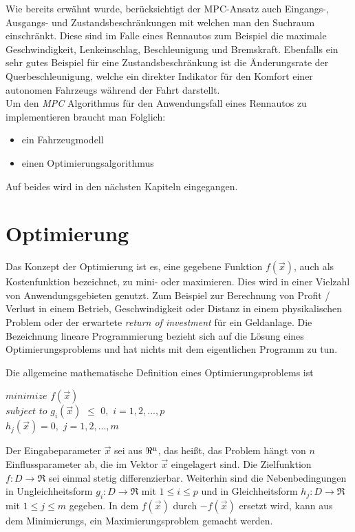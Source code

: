 \documentclass{like}
\begin{document}
Wie bereits erwähnt wurde, berücksichtigt der \ac{MPC}-Ansatz auch Eingangs-, Ausgangs- und Zustandsbeschränkungen mit welchen man den Suchraum einschränkt. Diese sind im Falle eines Rennautos zum Beispiel die maximale Geschwindigkeit, Lenkeinschlag, Beschleunigung und Bremskraft. Ebenfalls ein sehr gutes Beispiel für eine Zustandsbeschränkung ist die Änderungsrate der Querbeschleunigung, welche ein direkter Indikator für den Komfort einer autonomen Fahrzeugs während der Fahrt darstellt.\\

Um den \textit{\acl{MPC}} Algorithmus für den Anwendungsfall eines Rennautos zu implementieren braucht man Folglich:
\begin{itemize}
	\item ein Fahrzeugmodell
	\item einen Optimierungsalgorithmus 
\end{itemize}
Auf beides wird in den nächsten Kapiteln eingegangen.







\section{Optimierung}
Das Konzept der Optimierung ist es, eine gegebene Funktion \(f(\vec{x})\), auch als Kostenfunktion bezeichnet, zu mini- oder maximieren. 
Dies wird in einer Vielzahl von Anwendungsgebieten genutzt.
Zum Beispiel zur Berechnung von Profit / Verlust in einem Betrieb, Geschwindigkeit oder Distanz in einem physikalischen Problem oder der erwartete \textit{return of investment} für ein Geldanlage.  
Die Bezeichnung lineare Programmierung bezieht sich auf die Lösung eines  Optimierungsproblems und hat nichts mit dem eigentlichen Programm zu tun.

Die allgemeine mathematische Definition eines Optimierungsproblems ist

$minimize$  
\noindent\hspace*{3mm}%
$f(\vec{x}) $ \\
$subject$  $to$ 
\noindent\hspace*{3mm}%
$g_i(\vec{x})$ $\leq$ $0,$ $i=1,2,...,p$  \\
\noindent\hspace*{22mm}%
$h_j(\vec{x})= 0,$ $j= 1,2,...,m$\\ 
\noindent\hspace*{22mm}%


Der Eingabeparameter $\vec{x}$ sei aus $\Re \textsuperscript{n} $, das heißt, das Problem hängt von \(n\) Einflussparameter ab, die im Vektor $\vec{x}$ eingelagert sind. Die Zielfunktion $f:D \rightarrow \Re $ sei einmal stetig differenzierbar. Weiterhin sind die Nebenbedingungen in Ungleichheitsform $g_i:D \rightarrow \Re$ mit $1\leq i \leq p$ und in Gleichheitsform $h_j:D \rightarrow \Re$ mit $1\leq j \leq m$ gegeben.
In dem \(f(\vec{x})\) durch \(-f(\vec{x})\) ersetzt wird, kann aus dem Minimierungs, ein Maximierungsproblem gemacht werden.  
\end{document}
